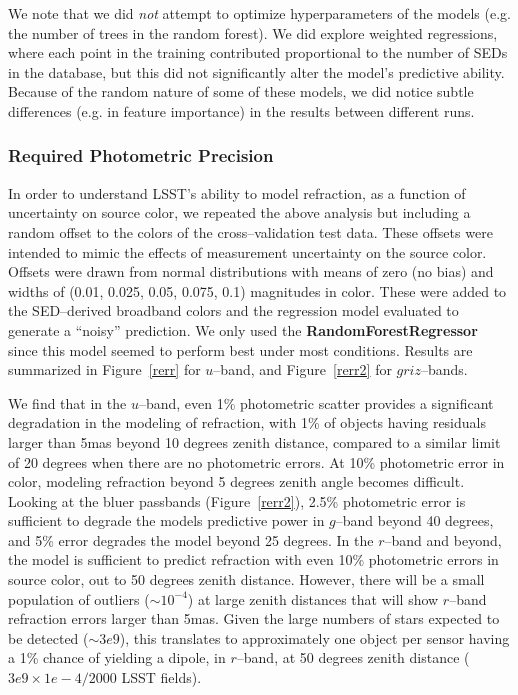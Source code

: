 \documentclass[DM,toc]{lsstdoc}
\begin{document}
We note that we did {\it not} attempt to optimize hyperparameters of
the models (e.g. the number of trees in the random forest).  We did
explore weighted regressions, where each point in the training
contributed proportional to the number of SEDs in the database, but
this did not significantly alter the model's predictive ability.
Because of the random nature of some of these models, we did notice
subtle differences (e.g. in feature importance) in the results between
different runs.

\subsubsection{\bf Required Photometric Precision \label{sec:rcolor}}

In order to understand LSST's ability to model refraction, as a
function of uncertainty on source color, we repeated the above
analysis but including a random offset to the colors of the
cross--validation test data.  These offsets were intended to mimic the
effects of measurement uncertainty on the source color.  Offsets were
drawn from normal distributions with means of zero (no bias) and
widths of (0.01, 0.025, 0.05, 0.075, 0.1) magnitudes in color.  These
were added to the SED--derived broadband colors and the regression
model evaluated to generate a ``noisy'' prediction.  We only used the
{\bf RandomForestRegressor} since this model seemed to perform best
under most conditions.  Results are summarized in Figure~\ref{rerr}
for $u$--band, and Figure~\ref{rerr2} for $griz$--bands.

We find that in the $u$--band, even 1\% photometric scatter provides a
significant degradation in the modeling of refraction, with 1\% of
objects having residuals larger than 5mas beyond 10 degrees zenith
distance, compared to a similar limit of 20 degrees when there are no
photometric errors.  At 10\% photometric error in color, modeling
refraction beyond 5 degrees zenith angle becomes difficult.  Looking
at the bluer passbands (Figure~\ref{rerr2}), 2.5\% photometric error
is sufficient to degrade the models predictive power in $g$--band
beyond 40 degrees, and 5\% error degrades the model beyond 25 degrees.
In the $r$--band and beyond, the model is sufficient to predict
refraction with even 10\% photometric errors in source color, out to
50 degrees zenith distance.  However, there will be a small population
of outliers ($\sim 10^{-4}$) at large zenith distances that will show
$r$--band refraction errors larger than 5mas.  Given the large numbers
of stars expected to be detected ($\sim 3e9$), this translates to
approximately one object per sensor having a 1\% chance of yielding a
dipole, in $r$--band, at 50 degrees zenith distance ($3e9 \times 1e-4 /
2000$ LSST fields).
\end{document}
